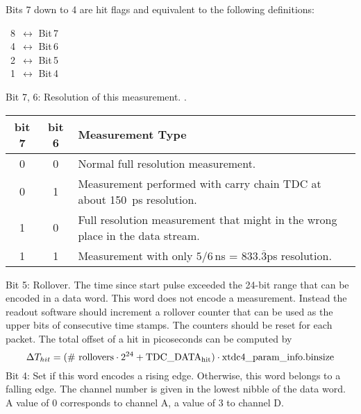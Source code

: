 	\label{flags}
	Bits 7 down to 4 are hit flags and equivalent to the following definitions:\par
	 {
        \indent{}~8~$\leftrightarrow$ Bit\,7\\
        \indent{}~4~$\leftrightarrow$ Bit\,6\\
        \indent{}~2~$\leftrightarrow$ Bit\,5\\
        \indent{}~1~$\leftrightarrow$ Bit\,4\par
		Bit 7, 6: Resolution of this measurement. .\\
		\noindent
		\begin{small}
		\begin{tabular}{|c|c||l|}
			\hline
			bit 7 & bit 6 & Measurement Type \\\hline\hline
			0 & 0 &  Normal full resolution measurement.\\\hline
			0 & 1 &  Measurement performed with carry chain TDC at about \SI{150}{\pico\second} resolution.\\\hline
			1 & 0 &  Full resolution measurement that might in the wrong place in the data stream.\\\hline
			1 & 1 &  Measurement with only $5/6$\,\si{\nano\second} = $833.\overline{3}$\si{\pico\second} resolution. \\\hline
		\end{tabular}
		\end{small}
		
	}
	Bit 5: Rollover. The time since start pulse exceeded the 24-bit range that can be encoded in a data word. This word does not encode a measurement. 
	Instead the readout software should increment a rollover counter that can be used as the upper bits of consecutive time stamps.  
	The counters should be reset for each packet.
	The total offset of a hit in picoseconds can be computed by
	\[	\Delta T_{hit} = \mathrm{(\#\ rollovers \cdot 2^{24} + TDC\_ DATA_{hit}) \cdot \itett{timetagger4}{xtdc4}\_param\_info.binsize} \]
	\indent
	Bit 4: Set if this word encodes a rising edge. Otherwise, this word belongs to a falling edge.
	The channel number is given in the lowest nibble of the data word. A value of 0 corresponds to channel A, a value of 3 to channel D.\par
 